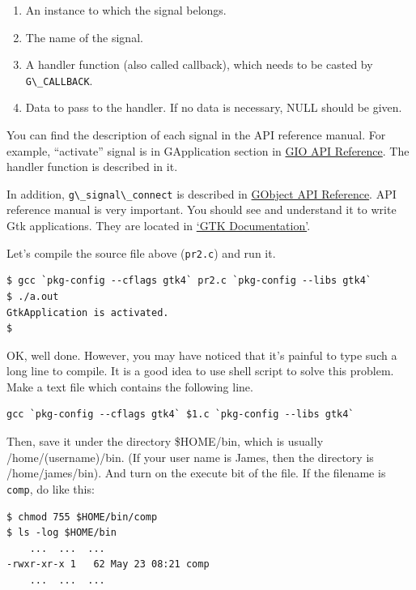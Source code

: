 \begin{enumerate}
\def\labelenumi{\arabic{enumi}.}
\tightlist
\item
  An instance to which the signal belongs.
\item
  The name of the signal.
\item
  A handler function (also called callback), which needs to be casted by
  \passthrough{\lstinline!G\_CALLBACK!}.
\item
  Data to pass to the handler. If no data is necessary, NULL should be
  given.
\end{enumerate}

You can find the description of each signal in the API reference manual.
For example, ``activate'' signal is in GApplication section in
\href{https://docs.gtk.org/gio/signal.Application.activate.html}{GIO API
Reference}. The handler function is described in it.

In addition, \passthrough{\lstinline!g\_signal\_connect!} is described
in \href{https://docs.gtk.org/gobject/func.signal_connect.html}{GObject
API Reference}. API reference manual is very important. You should see
and understand it to write Gtk applications. They are located in
\href{https://docs.gtk.org/}{`GTK Documentation'}.

Let's compile the source file above (\passthrough{\lstinline!pr2.c!})
and run it.

\begin{lstlisting}
$ gcc `pkg-config --cflags gtk4` pr2.c `pkg-config --libs gtk4`
$ ./a.out
GtkApplication is activated.
$
\end{lstlisting}

OK, well done. However, you may have noticed that it's painful to type
such a long line to compile. It is a good idea to use shell script to
solve this problem. Make a text file which contains the following line.

\begin{lstlisting}
gcc `pkg-config --cflags gtk4` $1.c `pkg-config --libs gtk4`
\end{lstlisting}

Then, save it under the directory \$HOME/bin, which is usually
/home/(username)/bin. (If your user name is James, then the directory is
/home/james/bin). And turn on the execute bit of the file. If the
filename is \passthrough{\lstinline!comp!}, do like this:

\begin{lstlisting}
$ chmod 755 $HOME/bin/comp
$ ls -log $HOME/bin
    ...  ...  ...
-rwxr-xr-x 1   62 May 23 08:21 comp
    ...  ...  ...
\end{lstlisting}


